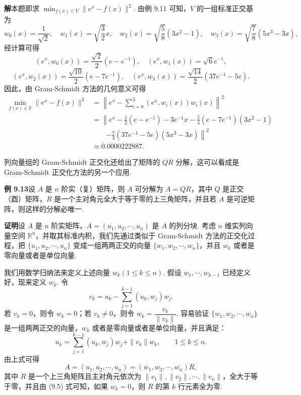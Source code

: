 \documentclass[UTF8, 12pt, fontset=fandol, oneside]{ctexart}
\begin{document}
\noindent\textbf{解}\quad 本题即求 $\min_{f(x)\in V}\|e^x-f(x)\|^2$. 由例 9.11 可知，$V$ 的一组标准正交基为
\[
w_0(x)=\frac1{\sqrt2},\quad w_1(x)=\sqrt{\frac32}x,\quad
w_2(x)=\sqrt{\frac58}(3x^2-1),\quad w_3(x)=\sqrt{\frac78}(5x^3-3x),
\]
经计算可得
\[
(e^x,w_0(x))=\frac{\sqrt2}{2}(e-e^{-1}),\quad
(e^x,w_1(x))=\sqrt6e^{-1},
\]
\[
(e^x,w_2(x))=\frac{\sqrt{10}}2(e-7e^{-1}),\quad
(e^x,w_3(x))=\frac{\sqrt{14}}2(37e^{-1}-5e).
\]
因此，由 Gram-Schmidt 方法的几何意义可得
\[
\begin{aligned}
\min_{f(x)\in V}\|e^x-f(x)\|^2
&=\left\|e^x-\sum_{i=0}^3(e^x,w_i(x))w_i(x)\right\|^2\\
&=\left\|e^x-\frac12(e-e^{-1})-3e^{-1}x
-\frac54(e-7e^{-1})(3x^2-1)\right.\\
&\qquad\left.-\frac74(37e^{-1}-5e)(5x^3-3x)\right\|^2\\
&\approx 0.0000222887.
\end{aligned}
\]

列向量组的 Gram-Schmidt 正交化还给出了矩阵的 $QR$ 分解，这可以看成是 Gram-Schmidt 正交化方法的另一个应用.

\noindent\textbf{例 9.13}\quad 设 $A$ 是 $n$ 阶实（复）矩阵，则 $A$ 可分解为 $A=QR$，其中 $Q$ 是正交（酉）矩阵，$R$ 是一个主对角元全大于等于零的上三角矩阵，并且若 $A$ 是可逆矩阵，则这样的分解必唯一.

\noindent\textbf{证明}\quad 设 $A$ 是 $n$ 阶实矩阵，$A=(u_1,u_2,\cdots,u_n)$ 是 $A$ 的列分块. 考虑 $n$ 维实列向量空间 $\mathbb{R}^n$，并取其标准内积，我们先通过类似于 Gram-Schmidt 方法的正交化过程，把 $\{u_1,u_2,\cdots,u_n\}$ 变成一组两两正交的向量 $\{w_1,w_2,\cdots,w_n\}$，并且 $w_k$ 或者是零向量或者是单位向量.

我们用数学归纳法来定义上述向量 $w_k(1\le k\le n)$. 假设 $w_1,\cdots,w_{k-1}$ 已经定义好，现来定义 $w_k$. 令
\[
v_k=u_k-\sum_{j=1}^{k-1}(u_k,w_j)w_j.
\]
若 $v_k=0$，则令 $w_k=0$；若 $v_k\ne 0$，则令 $w_k=\dfrac{v_k}{\|v_k\|}$. 容易验证 $\{w_1,w_2,\cdots,w_n\}$ 是一组两两正交的向量，$w_k$ 或者是零向量或者是单位向量，并且满足：
\begin{equation}
u_k=\sum_{j=1}^{k-1}(u_k,w_j)w_j+\|v_k\|w_k,\qquad 1\le k\le n.
\tag{9.5}
\end{equation}
由上式可得
\begin{equation}
A=(u_1,u_2,\cdots,u_n)=(w_1,w_2,\cdots,w_n)R,
\tag{9.6}
\end{equation}
其中 $R$ 是一个上三角矩阵且主对角元依次为 $\|v_1\|,\|v_2\|,\cdots,\|v_n\|$，全大于等于零，并且由 (9.5) 式可知，如果 $w_k=0$，则 $R$ 的第 $k$ 行元素全为零.
\end{document}
